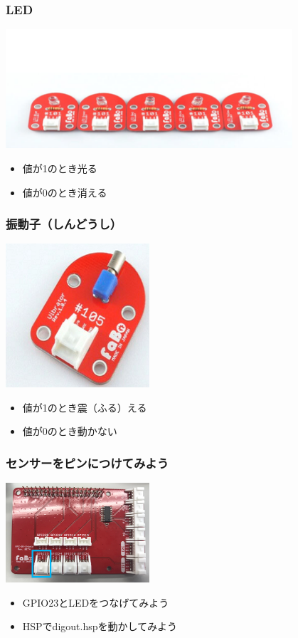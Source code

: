 \begin{frame}
    \frametitle{LED}
    \begin{center}
        \includegraphics[width=0.8\textwidth]{images/chap05/text05-img016.png}
        \begin{itemize}
            \item 値が1のとき光る
            \item 値が0のとき消える
        \end{itemize}
    \end{center}
\end{frame}

\begin{frame}
    \frametitle{振動子（しんどうし）}
    \begin{center}
        \includegraphics[width=0.4\textwidth]{images/chap05/text05-img017.png}
        \begin{itemize}
            \item 値が1のとき震（ふる）える
            \item 値が0のとき動かない
        \end{itemize}
    \end{center}
\end{frame}

\begin{frame}
    \frametitle{センサーをピンにつけてみよう}
    \begin{center}
        \includegraphics[width=0.4\textwidth]{images/chap05/text05-img027.png}
        \begin{itemize}
            \item GPIO23とLEDをつなげてみよう
            \item HSPでdigout.hspを動かしてみよう
        \end{itemize}
    \end{center}
\end{frame}

